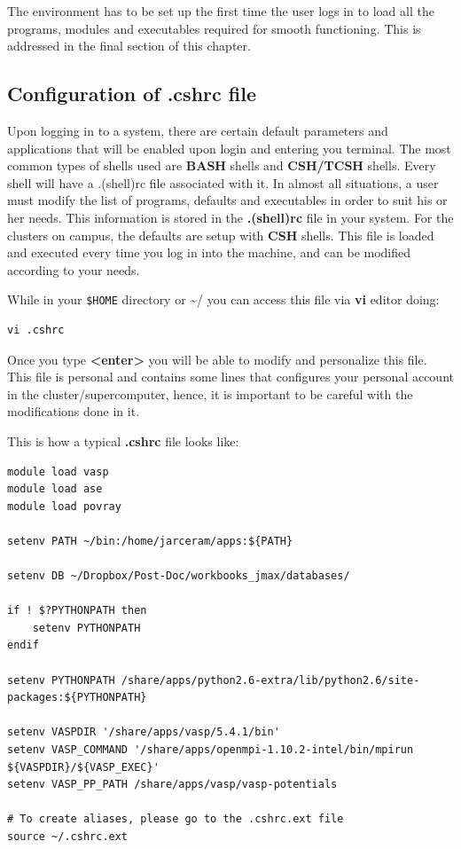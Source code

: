 \documentclass[11pt]{article}
\begin{document}
The environment has to be set up the first time the user logs in to load all the programs, modules and executables required for smooth functioning. This is addressed in the final section of this chapter. 

\subsection{Configuration of .cshrc file}
\label{sec-2-6}
Upon logging in to a system, there are certain default parameters and applications that will be enabled upon login and entering you terminal. The most common types of shells used are \textbf{BASH} shells and \textbf{CSH/TCSH} shells. Every shell will have a .(shell)rc file associated with it. In almost all situations, a user must modify the list of programs, defaults and executables in order to suit his or her needs. This information is stored in the \textbf{.(shell)rc} file in your system. For the clusters on campus, the defaults are setup with \textbf{CSH} shells. This file is loaded and executed every time you log in into the machine, and can be modified according to your needs.

While in your \texttt{\$HOME} directory or \textasciitilde{}/ you can access this file via \textbf{vi} editor doing:
\begin{verbatim}
vi .cshrc
\end{verbatim}

Once you type \textbf{<enter>} you will be able to modify and personalize this file. This file is personal and contains some lines that configures your personal account in the cluster/supercomputer, hence, it is important to be careful with the modifications done in it.

This is how a typical \textbf{.cshrc} file looks like:
\begin{verbatim}
module load vasp
module load ase
module load povray

setenv PATH ~/bin:/home/jarceram/apps:${PATH}

setenv DB ~/Dropbox/Post-Doc/workbooks_jmax/databases/

if ! $?PYTHONPATH then
    setenv PYTHONPATH
endif

setenv PYTHONPATH /share/apps/python2.6-extra/lib/python2.6/site-packages:${PYTHONPATH}

setenv VASPDIR '/share/apps/vasp/5.4.1/bin'
setenv VASP_COMMAND '/share/apps/openmpi-1.10.2-intel/bin/mpirun ${VASPDIR}/${VASP_EXEC}'
setenv VASP_PP_PATH /share/apps/vasp/vasp-potentials

# To create aliases, please go to the .cshrc.ext file
source ~/.cshrc.ext
\end{verbatim}
\end{document}
